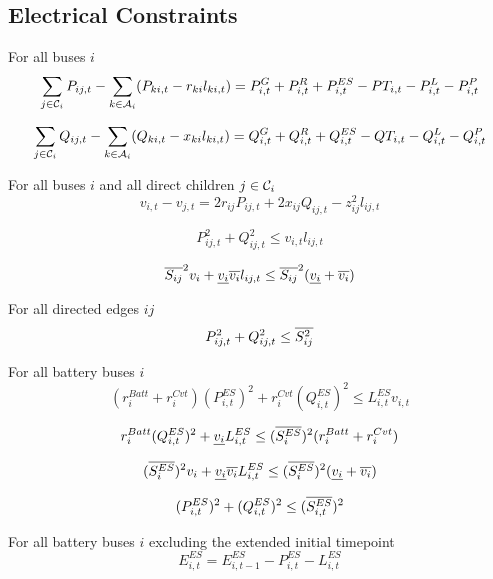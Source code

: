 \subsection{Electrical Constraints}

For all buses $i$ \atallt{}
\begin{equation}
  \sum_{j \in \mathcal C_i} P_{ij,t} - \sum_{k \in \mathcal A_i} (P_{ki,t} - r_{ki} l_{ki,t}) =
  P^G_{i,t} + P^R_{i,t} + P^{ES}_{i,t} - PT_{i,t} - P^L_{i,t} - P^P_{i,t}
\end{equation}

\begin{equation}
  \sum_{j \in \mathcal C_i} Q_{ij,t} - \sum_{k \in \mathcal A_i} (Q_{ki,t} - x_{ki} l_{ki,t}) =
  Q^G_{i,t} + Q^R_{i,t} + Q^{ES}_{i,t} - QT_{i,t} - Q^L_{i,t} - Q^P_{i,t}
\end{equation}


For all buses $i$ and all direct children $j \in \mathcal C_i$ \atallt{}
\begin{equation}
  v_{i,t} - v_{j,t} = 2r_{ij}P_{ij,t} + 2x_{ij}Q_{ij,t} - z^2_{ij}l_{ij,t}
\end{equation}

\begin{equation}
  P^2_{ij,t} + Q^2_{ij,t} \leq v_{i,t} l_{ij,t}
\end{equation}

\begin{equation}
  \overline{S_{ij}}^2v_i + \underline{v_i}\overline{v_i}l_{ij,t} \leq
  \overline{S_{ij}}^2 (\underline{v_i} + \overline{v_i})
\end{equation}

For all directed edges $ij$ \atallt{}
\begin{equation}
  P^2_{ij,t} + Q^2_{ij,t} \leq \overline{S^2_{ij}}
\end{equation}

For all battery buses $i$ \atallt{}
\begin{equation}
  (r^{Batt}_i + r^{Cvt}_i)(P^{ES}_{i,t})^2 + r^{Cvt}_i (Q^{ES}_{i,t})^2 \leq
  L^{ES}_{i,t}v_{i,t}
\end{equation}

\begin{equation}
  r^{Batt}_i (Q^{ES}_{i,t})^2 + \underline{v_i} L^{ES}_{i,t} \leq
  (\overline{S^{ES}_i})^2(r^{Batt}_i + r^{Cvt}_i)
\end{equation}

\begin{equation}
  (\overline{S^{ES}_i})^2v_i + \underline{v_i}\overline{v_i}L^{ES}_{i,t} \leq
  (\overline{S^{ES}_i})^2(\underline{v_i} + \overline{v_i})
\end{equation}

\begin{equation}
  (P^{ES}_{i,t})^2 + (Q^{ES}_{i,t})^2 \leq (\overline{S^{ES}_{i,t}})^2
\end{equation}

For all battery buses $i$ \atallextt{} excluding the extended initial timepoint
\begin{equation}
  E^{ES}_{i,t} = E^{ES}_{i,t-1} - P^{ES}_{i,t} - L^{ES}_{i,t}
\end{equation}
